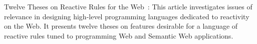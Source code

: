 Twelve Theses on Reactive Rules for the Web~\cite{10.1007-11896548_63}:
This article investigates issues of relevance in designing high-level
programming languages dedicated to reactivity on the Web. It presents
twelve theses on features desirable for a language of reactive rules tuned
to programming Web and Semantic Web applications.


